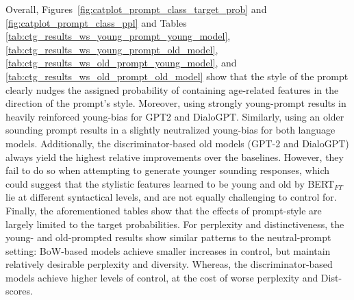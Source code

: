 Overall, Figures~\ref{fig:catplot_prompt_class_target_prob} and \ref{fig:catplot_prompt_class_ppl} and Tables \ref{tab:ctg_results_ws_young_prompt_young_model}, \ref{tab:ctg_results_ws_young_prompt_old_model}, \ref{tab:ctg_results_ws_old_prompt_young_model}, and \ref{tab:ctg_results_ws_old_prompt_old_model} show that the style of the prompt clearly nudges the assigned probability of containing age-related features in the direction of the prompt's style. Moreover, using strongly young-prompt results in heavily reinforced young-bias for GPT2 and DialoGPT. Similarly, using an older sounding prompt results in a slightly neutralized young-bias for both language models. Additionally, the discriminator-based old models (GPT-2 and DialoGPT) always yield the highest relative improvements over the baselines. However, they fail to do so when attempting to generate younger sounding responses, which could suggest that the stylistic features learned to be young and old by BERT$_{FT}$ lie at different syntactical levels, and are not equally challenging to control for. Finally, the aforementioned tables show that the effects of prompt-style are largely limited to the target probabilities. For perplexity and distinctiveness, the young- and old-prompted results show similar patterns to the neutral-prompt setting: BoW-based models achieve smaller increases in control, but maintain relatively desirable perplexity and diversity. Whereas, the discriminator-based models achieve higher levels of control, at the cost of worse perplexity and Dist-scores.


